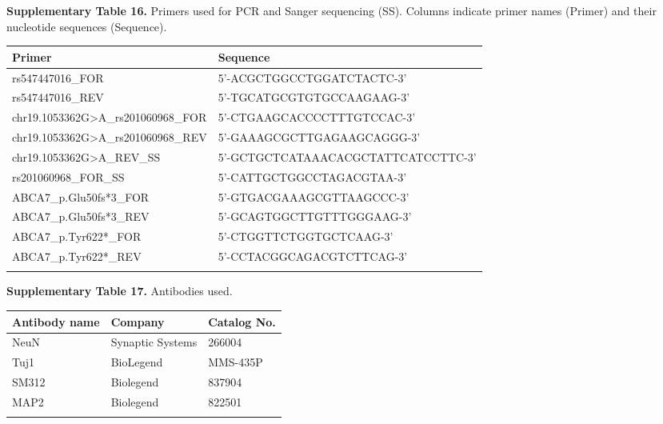 \clearpage
\textbf{Supplementary Table 16.} Primers used for PCR and Sanger sequencing (SS). Columns indicate primer names (Primer) and their nucleotide sequences (Sequence).
\begin{longtable}{p{7.5cm} p{10.5cm}}
    \hline
    \textbf{Primer} & \textbf{Sequence} \\
    \hline
    \hline
    rs547447016\_FOR              & 5’-ACGCTGGCCTGGATCTACTC-3’ \\
    \hline
    rs547447016\_REV              & 5’-TGCATGCGTGTGCCAAGAAG-3’ \\
    \hline
    chr19.1053362G>A\_rs201060968\_FOR   & 5’-CTGAAGCACCCCTTTGTCCAC-3’ \\
    \hline
    chr19.1053362G>A\_rs201060968\_REV   & 5’-GAAAGCGCTTGAGAAGCAGGG-3’ \\
    \hline
    chr19.1053362G>A\_REV\_SS      & 5’-GCTGCTCATAAACACGCTATTCATCCTTC-3’ \\
    \hline
    rs201060968\_FOR\_SS          & 5’-CATTGCTGGCCTAGACGTAA-3’ \\
    \hline
    ABCA7\_p.Glu50fs*3\_FOR       & 5’-GTGACGAAAGCGTTAAGCCC-3’ \\
    \hline
    ABCA7\_p.Glu50fs*3\_REV       & 5’-GCAGTGGCTTGTTTGGGAAG-3’ \\
    \hline
    ABCA7\_p.Tyr622*\_FOR         & 5’-CTGGTTCTGGTGCTCAAG-3’ \\
    \hline
    ABCA7\_p.Tyr622*\_REV         & 5’-CCTACGGCAGACGTCTTCAG-3’ \\
    \label{tab:pcr_primers}
\end{longtable}

\clearpage
\textbf{Supplementary Table 17.} Antibodies used. 
\begin{longtable}{p{6cm} p{5cm} p{6cm}}
    \hline
    \textbf{Antibody name}                & \textbf{Company}      & \textbf{Catalog No.} \\
    \hline
    \hline
    NeuN                                  & Synaptic Systems      & 266004               \\
    \hline
    Tuj1                                  & BioLegend             & MMS-435P             \\
    \hline
    SM312        & Biolegend             & 837904               \\
    \hline
    MAP2                                  & Biolegend             & 822501               \\
    \hline
    \label{tab:antibodies_used}
\end{longtable}

    
    